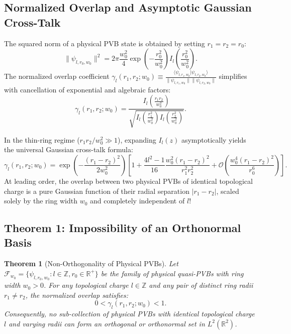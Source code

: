 \documentclass[11pt,a4paper]{article}
\newtheorem{theorem}{Theorem}
\begin{document}
\subsection{Normalized Overlap and Asymptotic Gaussian Cross-Talk}

The squared norm of a physical PVB state is obtained by setting $r_1 = r_2 = r_0$:
\begin{equation}
\|\psi_{l, r_0, w_0}\|^2 = 2\pi \frac{w_0^2}{4} \exp\left( - \frac{r_0^2}{w_0^2} \right) I_l\left( \frac{r_0^2}{w_0^2} \right).
\end{equation}
The normalized overlap coefficient $\gamma_l(r_1, r_2; w_0) \equiv \frac{\langle \psi_{l, r_1, w_0} | \psi_{l, r_2, w_0} \rangle}{\|\psi_{l, r_1, w_0}\| \|\psi_{l, r_2, w_0}\|}$ simplifies with cancellation of exponential and algebraic factors:
\begin{equation}
\boxed{\gamma_l(r_1, r_2; w_0) = \frac{I_l\left( \frac{r_1 r_2}{w_0^2} \right)}{\sqrt{I_l\left( \frac{r_1^2}{w_0^2} \right) I_l\left( \frac{r_2^2}{w_0^2} \right)}}.}
\label{eq:normalized_overlap}
\end{equation}

In the thin-ring regime ($r_1 r_2 / w_0^2 \gg 1$), expanding $I_l(z)$ asymptotically yields the universal Gaussian cross-talk formula:
\begin{equation}
\boxed{\gamma_l(r_1, r_2; w_0) = \exp\left( - \frac{(r_1 - r_2)^2}{2 w_0^2} \right) \left[ 1 + \frac{4l^2 - 1}{16} \frac{w_0^2 (r_1 - r_2)^2}{r_1^2 r_2^2} + \mathcal{O}\left( \frac{w_0^4 (r_1 - r_2)^2}{r_0^6} \right) \right].}
\label{eq:asymptotic_overlap}
\end{equation}
At leading order, the overlap between two physical PVBs of identical topological charge is a pure Gaussian function of their radial separation $|r_1 - r_2|$, scaled solely by the ring width $w_0$ and completely independent of $l$!

\subsection{Theorem 1: Impossibility of an Orthonormal Basis}

\begin{theorem}[Non-Orthogonality of Physical PVBs]
Let $\mathcal{F}_{w_0} = \{\psi_{l, r_0, w_0} : l \in \mathbb{Z}, r_0 \in \mathbb{R}^+\}$ be the family of physical quasi-PVBs with ring width $w_0 > 0$. For any topological charge $l \in \mathbb{Z}$ and any pair of distinct ring radii $r_1 \neq r_2$, the normalized overlap satisfies:
\begin{equation}
0 < \gamma_l(r_1, r_2; w_0) < 1.
\end{equation}
Consequently, no sub-collection of physical PVBs with identical topological charge $l$ and varying radii can form an orthogonal or orthonormal set in $L^2(\mathbb{R}^2)$.
\end{theorem}
\end{document}
